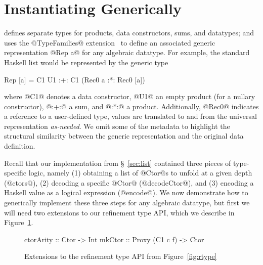 \section{Instantiating \toolname Generically}\label{sec:genericapp}

\GhcGenerics defines separate types for products, data constructors, sums, and
datatypes; and uses the @TypeFamilies@ extension~\cite{Chakravarty_ATS_2005} to define an 
associated generic representation @Rep a@ for any algebraic datatype. For 
example, the standard Haskell list would be represented by the generic type
%
\begin{code}
  Rep [a] = C1 U1 :+: C1 (Rec0 a :*: Rec0 [a])
\end{code}
%
where @C1@ denotes a data constructor, @U1@ an empty product (\eg for a nullary
constructor), @:+:@ a sum, and @:*:@ a product. Additionally, @Rec0@ indicates a
reference to a user-defined type, \ie values are translated to and from the
universal representation \emph{as-needed}. We omit some of the metadata to
highlight the structural similarity between the generic representation and the
original data definition.




Recall that our implementation from \S~\ref{sec:list} contained three
pieces of type-specific logic, namely
%
(1) obtaining a list of @Ctor@s to unfold at a given depth (@ctors@),
%
(2) decoding a specific @Ctor@ (@decodeCtor@), and
%
(3) encoding a Haskell value as a logical expression (@encode@).
%
We now demonstrate how to generically implement these three steps for any
algebraic datatype, but first we will need two extensions to our refinement type
API, which we describe in Figure~\ref{fig:rtype-ext}.

\begin{figure}
\begin{mdframed}
\begin{CenteredBox}
\begin{code} 
ctorArity :: Ctor -> Int
mkCtor    :: Proxy (C1 c f) -> Ctor
\end{code}
\end{CenteredBox}
\end{mdframed}
\caption{Extensions to the refinement type API from Figure~\ref{fig:rtype}}\label{fig:rtype-ext}
\end{figure}

